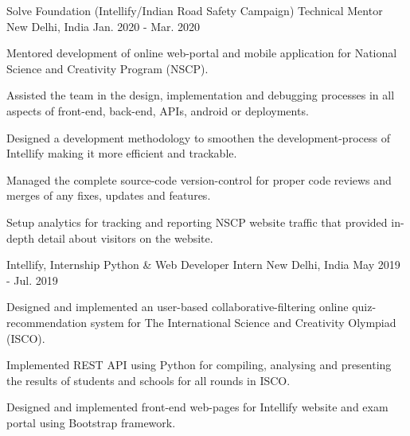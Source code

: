 \begin{cventries}
  \cventry
    {Solve Foundation (Intellify/Indian Road Safety Campaign)} %
    {Technical Mentor} %
    {New Delhi, India} %
    {Jan. 2020 - Mar. 2020} %
    {
      \begin{cvitems} %
        \item {Mentored development of online web-portal and mobile application for National Science and Creativity Program (NSCP).}
        \item {Assisted the team in the design, implementation and debugging processes in all aspects of front-end, back-end, APIs, android or deployments.}
        \item {Designed a development methodology to smoothen the development-process of Intellify making it more efficient and trackable.}
        \item {Managed the complete source-code version-control for proper code reviews and merges of any fixes, updates and features.}
        \item {Setup analytics for tracking and reporting NSCP website traffic that provided in-depth detail about visitors on the website.}
      \end{cvitems}
    }

  \cventry
    {Intellify, Internship} %
    {Python \& Web Developer Intern} %
    {New Delhi, India} %
    {May 2019 - Jul. 2019} %
    {
      \begin{cvitems} %
        \item {Designed and implemented an user-based collaborative-filtering online quiz-recommendation system for The International Science and Creativity Olympiad (ISCO).}
        \item {Implemented REST API using Python for compiling, analysing and presenting the results of students and  schools for all rounds in ISCO.}
        \item {Designed and implemented front-end web-pages for Intellify website and exam portal using Bootstrap framework.}
      \end{cvitems}
    }


\end{cventries}
